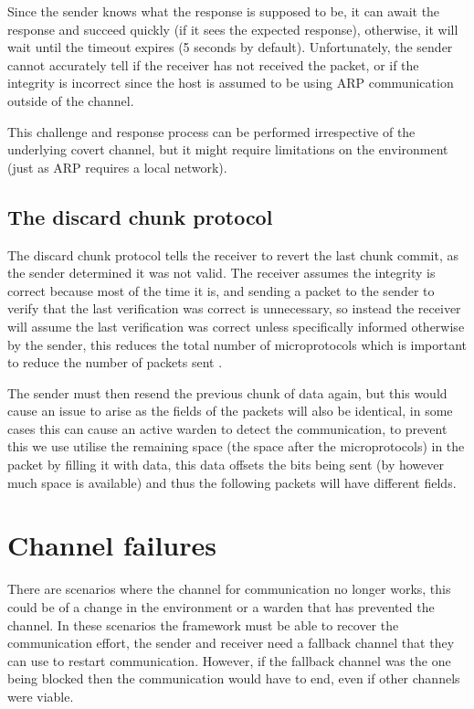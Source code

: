 Since the sender knows what the response is supposed to be, it can await the response and succeed quickly (if it sees the expected response), otherwise, it will wait until the timeout expires (5 seconds by default). Unfortunately, the sender cannot accurately tell if the receiver has not received the packet, or if the integrity is incorrect since the host is assumed to be using ARP communication outside of the channel.

This challenge and response process can be performed irrespective of the underlying covert channel, but it might require limitations on the environment (just as ARP requires a local network). 

\subsection{The discard chunk protocol}

The discard chunk protocol tells the receiver to revert the last chunk commit, as the sender determined it was not valid. The receiver assumes the integrity is correct because most of the time it is, and sending a packet to the sender to verify that the last verification was correct is unnecessary, so instead the receiver will assume the last verification was correct unless specifically informed otherwise by the sender, this reduces the total number of microprotocols which is important to reduce the number of packets sent \citep{DRiCCBoCP}.

The sender must then resend the previous chunk of data again, but this would cause an issue to arise as the fields of the packets will also be identical, in some cases this can cause an active warden to detect the communication, to prevent this we use utilise the remaining space (the space after the microprotocols) in the packet by filling it with data, this data offsets the bits being sent (by however much space is available) and thus the following packets will have different fields.

\section{Channel failures}
\label{sec:channel_failures}

There are scenarios where the channel for communication no longer works, this could be of a change in the environment or a warden that has prevented the channel. In these scenarios the framework must be able to recover the communication effort, the sender and receiver need a fallback channel that they can use to restart communication. However, if the fallback channel was the one being blocked then the communication would have to end, even if other channels were viable.

